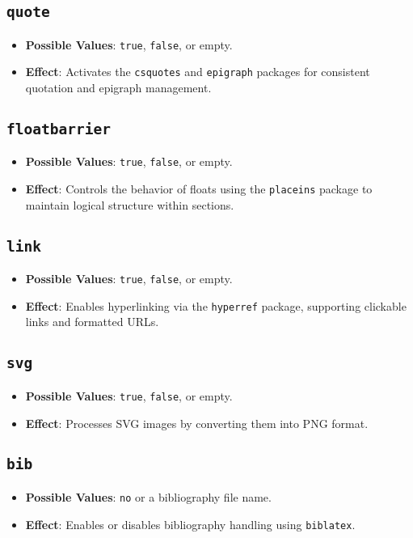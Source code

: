 \documentclass[12pt,twoside]{report}
\begin{document}
\subsection{\texttt{quote}}
\begin{itemize}
    \item \textbf{Possible Values}: \texttt{true}, \texttt{false}, or empty.
    \item \textbf{Effect}: Activates the \texttt{csquotes} and \texttt{epigraph} packages for consistent quotation and epigraph management.
\end{itemize}

\subsection{\texttt{floatbarrier}}
\begin{itemize}
    \item \textbf{Possible Values}: \texttt{true}, \texttt{false}, or empty.
    \item \textbf{Effect}: Controls the behavior of floats using the \texttt{placeins} package to maintain logical structure within sections.
\end{itemize}

\subsection{\texttt{link}}
\begin{itemize}
    \item \textbf{Possible Values}: \texttt{true}, \texttt{false}, or empty.
    \item \textbf{Effect}: Enables hyperlinking via the \texttt{hyperref} package, supporting clickable links and formatted URLs.
\end{itemize}

\subsection{\texttt{svg}}
\begin{itemize}
    \item \textbf{Possible Values}: \texttt{true}, \texttt{false}, or empty.
    \item \textbf{Effect}: Processes SVG images by converting them into PNG format.
\end{itemize}

\subsection{\texttt{bib}}
\begin{itemize}
    \item \textbf{Possible Values}: \texttt{no} or a bibliography file name.
    \item \textbf{Effect}: Enables or disables bibliography handling using \texttt{biblatex}.
\end{itemize}
\end{document}
